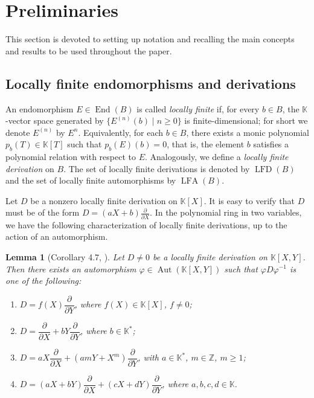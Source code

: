 \documentclass[11pt,a4paper,reqno]{amsart}
\newtheorem{lemma}[theorem]{Lemma}
\begin{document}
\section{Preliminaries}\label{sec:prelim} 

This section is devoted to setting up notation and recalling the main concepts and results to be used throughout the paper.


\subsection{Locally finite endomorphisms and derivations}

An endomorphism $E \in \operatorname{End}(B)$ is called \emph{locally finite} if, 
for every $b \in B$, the $\mathbb{K}$-vector space generated by $\{E^{(n)}(b) \mid n \ge 0\}$
is finite-dimensional; for short we denote $E^{(n)}$ by $E^n$. Equivalently, for each $b \in B$, there exists a monic polynomial $p_b(T) \in \mathbb{K}[T]$ such that $p_b(E)(b)=0$, that is, the element $b$ satisfies a polynomial relation with respect to $E$. Analogously, we define a \emph{locally finite derivation} on $B$.  The set of locally finite derivations is denoted by $\operatorname{LFD}(B)$ and the set of locally finite automorphisms by $\operatorname{LFA}(B)$.

Let $D$ be a nonzero locally finite derivation on $\mathbb{K}[X]$. It is easy to verify that  $D$ must be of the form $D = (aX + b)\frac{\partial}{\partial X}$. In the polynomial ring in two variables, we have the following characterization of locally finite derivations, up to the action of an automorphism.


\begin{lemma}[Corollary 4.7, \cite{V92}]
\label{lfdclas}
Let $D\neq 0$ be a locally finite derivation on $\mathbb{K}[X,Y]$. Then there exists an automorphism $\varphi \in \operatorname{Aut}(\mathbb{K}[X,Y])$ such that $\varphi D \varphi^{-1}$ is one of the following:
\begin{enumerate}
    \item $D = f(X)\dfrac{\partial}{\partial Y}$, where $f(X) \in \mathbb{K}[X]$, $f\neq 0$;
    \item $D = \dfrac{\partial}{\partial X} + bY\dfrac{\partial}{\partial Y}$, where $b\in\mathbb{K}^*$;
    \item $D = aX\dfrac{\partial}{\partial X} + (amY + X^m)\dfrac{\partial}{\partial Y}$, with $a\in\mathbb{K}^*$, $m\in \mathbb{Z}$, $m\geq 1$;
    \item $D = (aX + bY)\dfrac{\partial}{\partial X} + (cX + dY)\dfrac{\partial}{\partial Y}$, where $a,b,c,d \in \mathbb{K}$.
\end{enumerate}
\end{lemma}
\end{document}
